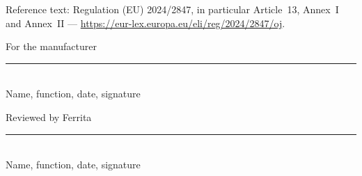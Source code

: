 \documentclass[11pt,a4paper]{article}
\newcommand{\PartnerName}{Ferrita}
\begin{document}
Reference text: Regulation (EU) 2024/2847, in particular Article~13, Annex~I
and Annex~II --- \url{https://eur-lex.europa.eu/eli/reg/2024/2847/oj}.

\vspace{1.2cm}
\noindent
\begin{minipage}[t]{0.47\textwidth}
  {\color{grey}\small For the manufacturer}\\[1.8cm]
  {\color{rulegrey}\rule{\linewidth}{0.4pt}}\\
  \small Name, function, date, signature
\end{minipage}\hfill
\begin{minipage}[t]{0.47\textwidth}
  {\color{grey}\small Reviewed by \PartnerName}\\[1.8cm]
  {\color{rulegrey}\rule{\linewidth}{0.4pt}}\\
  \small Name, function, date, signature
\end{minipage}
\end{document}
